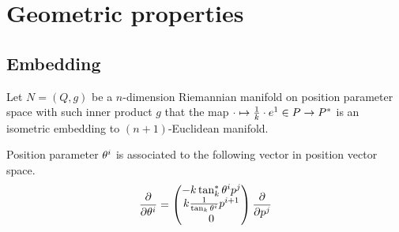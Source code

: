 \documentclass[stu, babel, american, biblatex, a4paper, leqno, draftall]{apa7}
\begin{document}
\section{Geometric properties}
\subsection{Embedding}
\begin{definition}\label{M:Embedding}
    Let $N=\left(Q,g\right)$ be a $n$-dimension Riemannian manifold
    on position parameter space with such inner product $g$ that
    the map $\cdot\mapsto\frac{1}{k}\cdot\tensor{e}{^1}\in P\to P^\ast$ is an isometric embedding to $\left(n+1\right)$-Euclidean manifold.
\end{definition}
\begin{lemma}\label{M:Tangent:Basis}
    Position parameter $\tensor{\theta}{^i}$ is associated to the following vector in position vector space.
    \begin{equation*}
        \frac{\partial}{\partial\tensor{\theta}{^i}} =
        \begin{pmatrix}
            -k\tan_k^\ast\tensor{\theta}{^i}\tensor{p}{^j}         \\
            k\frac{1}{\tan_k\tensor{\theta}{^i}}\tensor{p}{^{i+1}} \\
            0
        \end{pmatrix} \frac{\partial}{\partial\tensor{p}{^j}}
    \end{equation*}
\end{lemma}
\end{document}
